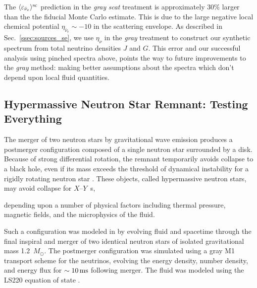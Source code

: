 \documentclass[aps,floatfix,prd,superscriptaddress,twocolumn]{revtex4-1}
\newcommand{\todo}[1]{\marginpar{\tiny{\textcolor{red}{#1}}}}
\renewcommand\todo[1]{} %
\begin{document}
The $\langle\varepsilon_{\bar{\nu}_e}\rangle^{\rm sc}$ prediction
in the \emph{gray} \emph{scat} treatment is approximately 30\%
larger than the the fiducial Monte Carlo estimate. This is
due to the large negative local chemical potential
$\eta_{\bar{\nu}_e}\sim-10$ in the scattering envelope.
As described in Sec.~\ref{ssec:sources_se},
we use $\eta_\nu$ in the \emph{gray} treatment to construct our
synthetic spectrum from total neutrino densities $J$ and $G$.
This error and our successful analysis using pinched spectra above,
points the way to future improvements to the \emph{gray} method:
making better assumptions about the spectra which don't depend upon
local fluid quantities.

\subsection{Hypermassive Neutron Star Remnant:
  Testing Everything}
\label{ssec:test_disk_comparison}
The merger of two neutron stars by gravitational wave emission produces a
postmerger configuration composed of a single neutron star surrounded by a disk.
Because of strong differential rotation, the remnant temporarily avoids
collapse to a black hole, even if its mass exceeds the threshold of dynamical
instability for a rigidly rotating neutron star \cite{duez2009-review}.
These objects, called hypermassive neutron stars,
may avoid collapse for $X\textrm{--}Y$~s,
\todo{cite $X$, $Y$}
depending upon a number of physical factors including thermal pressure,
magnetic fields, and the microphysics of the fluid.

Such a configuration was modeled in \cite{fouc2016-m1_nsns} by
evolving fluid and spacetime through the
final inspiral and merger of two identical neutron stars of
isolated gravitational mass 1.2~$M_{\odot}$. The postmerger configuration
was simulated using a gray M1 transport scheme for the neutrinos, evolving the
energy density, number density, and energy flux \cite{fouc2016-m1_evolve_n}
for $\sim10\,{\rm ms}$ following merger.
The fluid was modeled using the LS220 equation of state \cite{latt1991-nuc_eos}.
\end{document}
